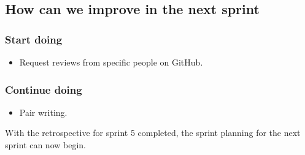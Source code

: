 \subsection{How can we improve in the next sprint}
\subsubsection{Start doing}
\begin{itemize}
    \item Request reviews from specific people on GitHub.
\end{itemize}
\subsubsection{Continue doing}
\begin{itemize}
    \item Pair writing.
\end{itemize}

With the retrospective for sprint 5 completed, the sprint planning for the next sprint can now begin. 